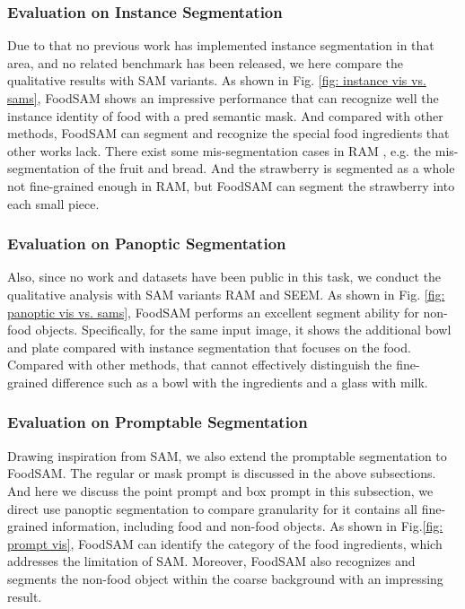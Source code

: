 \documentclass[lettersize,journal]{IEEEtran}
\begin{document}
\subsubsection*{Evaluation on Instance Segmentation}

Due to that no previous work has implemented instance segmentation in that area, 
and no related benchmark has been released, we here compare the qualitative results with SAM variants. 
As shown in Fig. \ref{fig: instance vis vs. sams}, FoodSAM shows an impressive performance that can recognize well the instance identity of food with a pred semantic mask. 
And compared with other methods, FoodSAM can segment and recognize the special food ingredients that other works lack.
There exist some mis-segmentation cases in RAM \cite{zhang2023recognize}, e.g. the mis-segmentation of the fruit and bread.
And the strawberry is segmented as a whole not fine-grained enough in RAM, but FoodSAM can segment the strawberry into each small piece.

\subsubsection*{Evaluation on Panoptic Segmentation}

Also, since no work and datasets have been public in this task, we conduct the qualitative analysis with SAM variants RAM and SEEM. 
As shown in Fig. \ref{fig: panoptic vis vs. sams}, FoodSAM performs an excellent segment ability for non-food objects. 
Specifically, for the same input image, it shows the additional bowl and plate compared with instance segmentation that focuses on the food. 
Compared with other methods, that cannot effectively distinguish the fine-grained difference such as a bowl with the ingredients and a glass with milk.

\subsubsection*{Evaluation on Promptable Segmentation}

Drawing inspiration from SAM, we also extend the promptable segmentation to FoodSAM.
The regular or mask prompt is discussed in the above subsections. 
And here we discuss the point prompt and box prompt in this subsection, we direct use panoptic segmentation to compare granularity for it contains all fine-grained information, including food and non-food objects.
As shown in Fig.\ref{fig: prompt vis}, FoodSAM can identify the category of the food ingredients, which addresses the limitation of SAM. 
Moreover, FoodSAM also recognizes and segments the non-food object within the coarse background with an impressing result.
\end{document}
